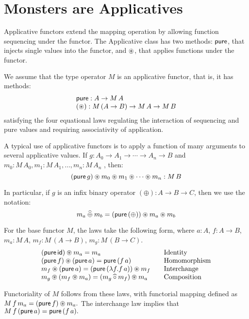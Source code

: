 \section{Monsters are Applicatives}

Applicative functors \cite{mcbride/paterson:2008}
extend the mapping operation by allowing function sequencing under the functor.
The Applicative class has two methods: $\mathsf{pure}$, that injects single values into the functor, and $\circledast$, that applies functions under the functor.

We assume that the type operator $M$ is an applicative functor, that is, it has methods:
$$
\begin{array}{l}
\mathsf{pure} : A \rightarrow M\,A\\
(\circledast): M\,(A\rightarrow B) \rightarrow M\,A \rightarrow M\,B
\end{array}
$$
satisfying the four equational laws regulating the interaction of sequencing and pure values and requiring associativity of application.

A typical use of applicative functors is to apply a function of many arguments to several applicative values.
If $g:A_0\rightarrow A_1 \rightarrow \cdots \rightarrow A_n \rightarrow B$ and $m_0:M\,A_0, m_1:M\,A_1, \ldots, m_n:M\,A_n$ , then:
$$
(\mathsf{pure}\,g) \circledast m_0 \circledast m_1 \circledast \cdots \circledast m_n : M\,B
$$

In particular, if $g$ is an infix binary operator $(\oplus) : A \rightarrow B \rightarrow C$, then we use the notation:
$$
m_a \mathbin{\widehat{\oplus}} m_b = (\mathsf{pure}\,(\oplus)) \circledast m_a \circledast m_b
$$

For the base functor $M$, the laws take the following form, where
 $a:A$, $f:A\rightarrow B$,
$m_a:M\,A$, $m_f:M\,(A\rightarrow B)$, $m_g:M\,(B\rightarrow C)$.
$$
\begin{array}{l@{\qquad}l}
(\apure\,\id) \appl m_a = m_a
  & \mbox{Identity} \\
(\apure\,f) \appl (\apure\,a) = \apure\,(f\,a)
  & \mbox{Homomorphism} \\
m_f \appl (\apure\,a) = (\apure\,(\lambda f. f\,a)) \appl m_f
  & \mbox{Interchange} \\
m_g \appl (m_f \appl m_a) = (m_g \alift{\comp} m_f) \appl m_a
  & \mbox{Composition}
\end{array}
$$

Functoriality of $M$ follows from these laws, with functorial mapping defined as
$
M\,f\,m_a = (\mathsf{pure}\,f) \circledast m_a.
$
The interchange law implies that
$
M\,f\,(\mathsf{pure}\,a) = \mathsf{pure}\,(f\,a).
$


